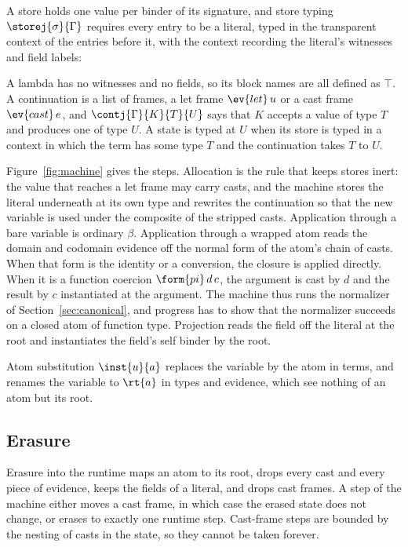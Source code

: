 A store holds one value per binder of its signature, and store typing $\storej{\sigma}{\Gamma}$ requires every entry to be a literal, typed in the transparent context of the entries before it, with the context recording the literal's witnesses and field labels:
A lambda has no witnesses and no fields, so its block names are all defined as $\top$. A continuation is a list of frames, a let frame $\ev{let}\,u$ or a cast frame $\ev{cast}\,e$, and $\contj{\Gamma}{K}{T}{U}$ says that $K$ accepts a value of type $T$ and produces one of type $U$. A state is typed at $U$ when its store is typed in a context in which the term has some type $T$ and the continuation takes $T$ to $U$.

Figure~\ref{fig:machine} gives the steps. Allocation is the rule that keeps stores inert: the value that reaches a let frame may carry casts, and the machine stores the literal underneath at its own type and rewrites the continuation so that the new variable is used under the composite of the stripped casts. Application through a bare variable is ordinary $\beta$. Application through a wrapped atom reads the domain and codomain evidence off the normal form of the atom's chain of casts. When that form is the identity or a conversion, the closure is applied directly. When it is a function coercion $\form{pi}\,d\,c$, the argument is cast by $d$ and the result by $c$ instantiated at the argument. The machine thus runs the normalizer of Section~\ref{sec:canonical}, and progress has to show that the normalizer succeeds on a closed atom of function type. Projection reads the field off the literal at the root and instantiates the field's self binder by the root.

Atom substitution $\inst{u}{a}$ replaces the variable by the atom in terms, and renames the variable to $\rt{a}$ in types and evidence, which see nothing of an atom but its root.

\subsection{Erasure}

Erasure into the runtime maps an atom to its root, drops every cast and every piece of evidence, keeps the fields of a literal, and drops cast frames. A step of the machine either moves a cast frame, in which case the erased state does not change, or erases to exactly one runtime step. Cast-frame steps are bounded by the nesting of casts in the state, so they cannot be taken forever.

